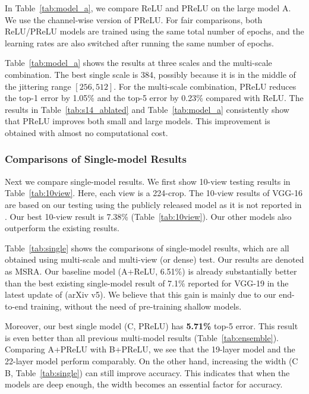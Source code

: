 \documentclass[10pt,twocolumn,letterpaper]{article}
\begin{document}
In Table~\ref{tab:model_a}, we compare ReLU and PReLU on the large model A. We use the channel-wise version of PReLU. For fair comparisons, both ReLU/PReLU models are trained using the same total number of epochs, and the learning rates are also switched after running the same number of epochs.

Table~\ref{tab:model_a} shows the results at three scales and the multi-scale combination. The best single scale is 384, possibly because it is in the middle of the jittering range $[256, 512]$.
For the multi-scale combination, PReLU reduces the top-1 error by 1.05\% and the top-5 error by 0.23\% compared with ReLU.
The results in Table~\ref{tab:s14_ablated} and Table~\ref{tab:model_a} consistently show that PReLU improves both small and large models. This improvement is obtained with almost no computational cost.

\subsubsection*{Comparisons of Single-model Results}

Next we compare single-model results. We first show 10-view testing results \cite{Krizhevsky2012} in Table~\ref{tab:10view}. Here, each view is a 224-crop. The 10-view results of VGG-16 are based on our testing using the publicly released model \cite{Simonyan2014} as it is not reported in \cite{Simonyan2014}. Our best 10-view result is 7.38\% (Table~\ref{tab:10view}). Our other models also outperform the existing results.

Table~\ref{tab:single} shows the comparisons of single-model results, which are all obtained using multi-scale and multi-view (or dense) test. Our results are denoted as MSRA. Our baseline model (A+ReLU, 6.51\%) is already substantially better than the best existing single-model result of 7.1\% reported for VGG-19 in the latest update of \cite{Simonyan2014} (arXiv v5). We believe that this gain is mainly due to our end-to-end training, without the need of pre-training shallow models.

Moreover, our best single model (C, PReLU) has \textbf{5.71\%} top-5 error. This result is even better than all previous multi-model results (Table~\ref{tab:ensemble}).
Comparing A+PReLU with B+PReLU, we see that the 19-layer model and the 22-layer model perform comparably. On the other hand, increasing the width (C \vs B, Table~\ref{tab:single}) can still improve accuracy. This indicates that when the models are deep enough, the width becomes an essential factor for accuracy.
\end{document}
